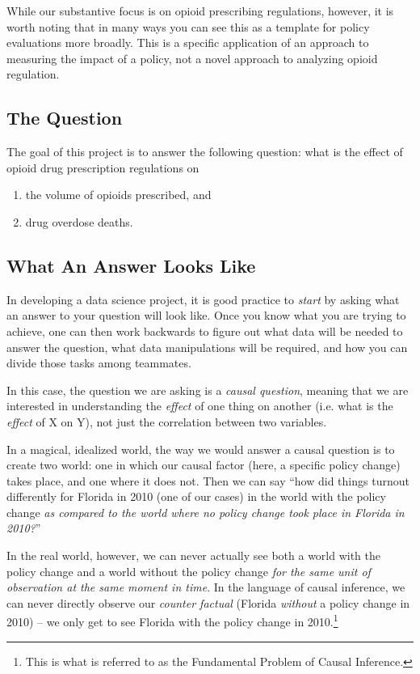\documentclass[12pt]{article}
\begin{document}
While our substantive focus is on opioid prescribing regulations, however, it is worth noting that in many ways you can see this as a template for policy evaluations more broadly. This is a specific application of an approach to measuring the impact of a policy, not a novel approach to analyzing opioid regulation.

\subsection*{The Question}

The goal of this project is to answer the following question: what is the effect of opioid drug prescription regulations on

\begin{enumerate}
  \item the volume of opioids prescribed, and
  \item drug overdose deaths.
\end{enumerate}

\subsection*{What An Answer Looks Like}

In developing a data science project, it is good practice to \emph{start} by asking what an answer to your question will look like. Once you know what you are trying to achieve, one can then work backwards to figure out what data will be needed to answer the question, what data manipulations will be required, and how you can divide those tasks among teammates.

In this case, the question we are asking is a \emph{causal question}, meaning that we are interested in understanding the \emph{effect} of one thing on another (i.e. what is the \emph{effect} of X on Y), not just the correlation between two variables.

In a magical, idealized world, the way we would answer a causal question is to create two world: one in which our causal factor (here, a specific policy change) takes place, and one where it does not. Then we can say ``how did things turnout differently for Florida in 2010 (one of our cases) in the world with the policy change \emph{as compared to the world where no policy change took place in Florida in 2010?}''

In the real world, however, we can never actually see both a world with the policy change and a world without the policy change \emph{for the same unit of observation at the same moment in time}. In the language of causal inference, we can never directly observe our \emph{counter factual} (Florida \emph{without} a policy change in 2010) -- we only get to see Florida with the policy change in 2010.\footnote{This is what is referred to as the Fundamental Problem of Causal Inference.}
\end{document}
